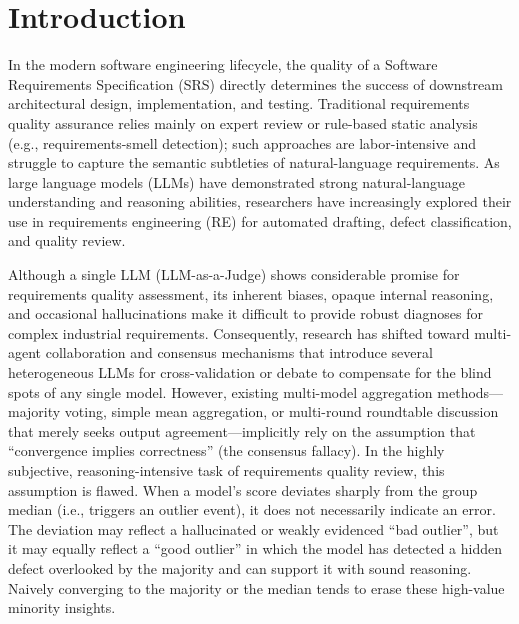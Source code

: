 \documentclass[sn-mathphys-num]{sn-jnl}
\begin{document}
\section{Introduction}\label{sec:introduction}
In the modern software engineering lifecycle, the quality of a Software Requirements Specification (SRS) directly determines the success of downstream architectural design, implementation, and testing. Traditional requirements quality assurance relies mainly on expert review or rule-based static analysis (e.g., requirements-smell detection); such approaches are labor-intensive and struggle to capture the semantic subtleties of natural-language requirements. As large language models (LLMs) have demonstrated strong natural-language understanding and reasoning abilities, researchers have increasingly explored their use in requirements engineering (RE) for automated drafting, defect classification, and quality review.

Although a single LLM (LLM-as-a-Judge) shows considerable promise for requirements quality assessment, its inherent biases, opaque internal reasoning, and occasional hallucinations make it difficult to provide robust diagnoses for complex industrial requirements. Consequently, research has shifted toward multi-agent collaboration and consensus mechanisms that introduce several heterogeneous LLMs for cross-validation or debate to compensate for the blind spots of any single model. However, existing multi-model aggregation methods---majority voting, simple mean aggregation, or multi-round roundtable discussion that merely seeks output agreement---implicitly rely on the assumption that ``convergence implies correctness'' (the consensus fallacy). In the highly subjective, reasoning-intensive task of requirements quality review, this assumption is flawed. When a model's score deviates sharply from the group median (i.e., triggers an outlier event), it does not necessarily indicate an error. The deviation may reflect a hallucinated or weakly evidenced ``bad outlier'', but it may equally reflect a ``good outlier'' in which the model has detected a hidden defect overlooked by the majority and can support it with sound reasoning. Naively converging to the majority or the median tends to erase these high-value minority insights.
\end{document}
